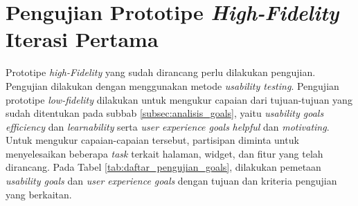 \section{Pengujian Prototipe \textit{High-Fidelity} Iterasi Pertama}
\label{sec:test_hifi_1}

Prototipe \textit{high-Fidelity} yang sudah dirancang perlu dilakukan pengujian. Pengujian dilakukan dengan menggunakan metode \textit{usability testing}. Pengujian prototipe \textit{low-fidelity} dilakukan untuk mengukur capaian dari tujuan-tujuan yang sudah ditentukan pada subbab \ref{subsec:analisis_goals}, yaitu \textit{usability goals} \textit{efficiency} dan \textit{learnability} serta \textit{user experience goals} \textit{helpful} dan \textit{motivating}. Untuk mengukur capaian-capaian tersebut, partisipan diminta untuk menyelesaikan beberapa \textit{task} terkait halaman, widget, dan fitur yang telah dirancang. Pada Tabel \ref{tab:daftar_pengujian_goals}, dilakukan pemetaan \textit{usability goals} dan \textit{user experience goals} dengan tujuan dan kriteria pengujian yang berkaitan.

